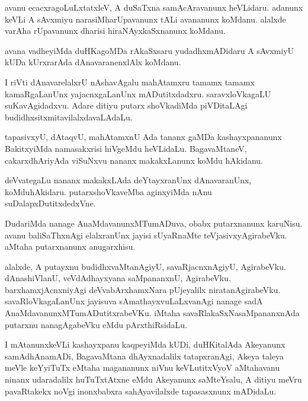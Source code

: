 \documentclass{article}
\begin{document}
\begin{mn}
avanu ecacxragoLuLxtatxleV, A duSaTxna samAcAravanunx  heVLidaru.  adanunx
 keVLi  A sAvxmiyu narasiMharUpavanunx  tALi avananunx koMdanu.  alalxde 
 varAha rUpavanunx dharisi hiraNAyxkaSxnanunx koMdanu.
\end{mn}

\begin{mn}
avana vadheyiMda duHKagoMDa rAkaSxsaru yudadhxmADidaru A sAvxmiyU 
kUDa kUrxrarAda dAnavaranenxlAlx koMdanu.
\end{mn}

\begin{mn}
I riVti dAnavarelalxrU nAshavAgalu  mahAtamxru tamamx tamamx kamaRgaLanUnx 
yajacnxgaLanUnx mADutitxdadxru.  saravxloVkagaLU suKavAgidadxvu.  Adare 
ditiyu putarx shoVkadiMda piVDitaLAgi budidhxsitxmitavilalxdavaLAdaLu.
\end{mn}

\begin{mn}
tapasivxyU, dAtaqvU,  mahAtamxnU Ada tananx gaMDa kashayxpananunx  BakitxyiMda  
namasakxrisi  hiVgeMdu heVLidaLu.  BagavaMtaneV,  cakarxdhAriyAda viSuNxvu 
nananx makakxLanunx  koMdu hAkidanu.
\end{mn}

\begin{mn}
deVvategaLu nananx makakxLAda deYtayxranUnx dAnavaranUnx, koMduhAkidaru.  
putarxshoVkaveMba  aginxyiMda nAnu suDalapxDutitxdedxVne.
\end{mn}

\begin{mn}
DudariMda nanage AnaMdavanunxMTumADuva,  obabx putarxnanunx karuNisu.  avanu 
baliSaThxnAgi  elalxranUnx jayisi sUyaRnaMte teVjasivxyAgirabeVku.  
aMtaha putarxnanunx anugarxhisu. 
\end{mn}

\begin{mn}
alalxde, A  putayxnu  budidhxvaMtanAgiyU,  savaRjacnxnAgiyU, AgirabeVku.  
dAnashiVlanU, veVdAdhayxyana saMpananxnU,  AgirabeVku.  barxhamxjAcnxniyAgi 
deVvabArxhamxNara pUjeyalilx  niratanAgirabeVku. savaRloVkagaLanUnx jayisuva  
sAmathayxvuLaLxvanAgi nanage sadA AnaMdavanunxMTumADutitxrabeVKu.  iMtaha  
savaRlakaSxNasaMpananxnAda  putarxnu nanagAgabeVku  eMdu pArxthiRsidaLu.
\end{mn}

\begin{mn}
I mAtanunxkeVLi kashayxpanu kaqpeyiMda kUDi, duHKitalAda Akeyanunx samAdhAnamADi, 
BagavaMtana dhAyxnadalilx tatapxranAgi, Akeya taleya meVle keYyiTuTx eMtaha 
magananunx niVnu keVLutitxVyoV aMtahavanu ninanx udaradalilx huTuTxtAtxne eMdu 
Akeyanunx  saMteYsalu, A ditiyu meVru pavaRtakekx noVgi inonxbabxra 
sahAyavilalxde tapasasxnunx mADidaLu.
\end{mn}
\end{document}
